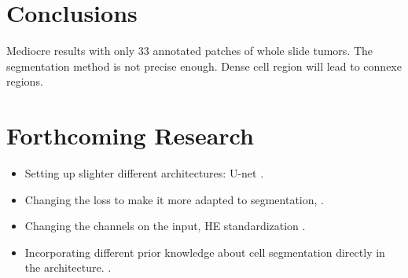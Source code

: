\documentclass[a0,portrait]{a0poster}
\begin{document}
\begin{multicols}{2}


\section*{Conclusions}

Mediocre results with only 33 annotated patches of whole slide tumors.
The segmentation method is not precise enough. Dense cell region will lead to connexe regions.


\section*{Forthcoming Research}

\color{SaddleBrown} %

\begin{itemize}
\item Setting up slighter different architectures: U-net \cite{UNet}.
\item Changing the loss to make it more adapted to segmentation, \cite{UNet}.
\item Changing the channels on the input, HE standardization \cite{deconvolution}.
\item Incorporating different prior knowledge about cell segmentation directly in the architecture. \cite{ranefall2016fast}.
\end{itemize}

\color{DarkSlateGray} %


%


\end{multicols}
\end{document}
